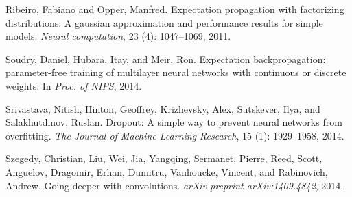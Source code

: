 \documentclass{article} %
\begin{document}
\begin{thebibliography}{10}
Ribeiro, Fabiano and Opper, Manfred.
\newblock Expectation propagation with factorizing distributions: A gaussian
  approximation and performance results for simple models.
\newblock \emph{Neural computation}, 23 (4): 1047--1069,
  2011.

Soudry, Daniel, Hubara, Itay, and Meir, Ron.
\newblock Expectation backpropagation: parameter-free training of multilayer
  neural networks with continuous or discrete weights.
\newblock In \emph{Proc. of NIPS}, 2014.

Srivastava, Nitish, Hinton, Geoffrey, Krizhevsky, Alex, Sutskever, Ilya, and
  Salakhutdinov, Ruslan.
\newblock Dropout: A simple way to prevent neural networks from overfitting.
\newblock \emph{The Journal of Machine Learning Research}, 15
  (1): 1929--1958, 2014.

Szegedy, Christian, Liu, Wei, Jia, Yangqing, Sermanet, Pierre, Reed, Scott,
  Anguelov, Dragomir, Erhan, Dumitru, Vanhoucke, Vincent, and Rabinovich,
  Andrew.
\newblock Going deeper with convolutions.
\newblock \emph{arXiv preprint arXiv:1409.4842}, 2014.

\end{thebibliography}
\end{document}
